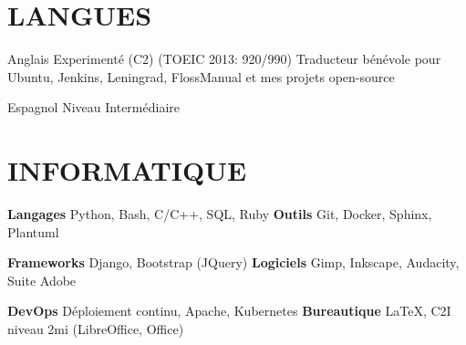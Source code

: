 \documentclass[11pt,a4paper]{moderncv}
\begin{document}


  \section{LANGUES}

  \cvlanguage
    {Anglais}
    {Experimenté (C2) (TOEIC 2013: 920/990)}
    {Traducteur bénévole pour Ubuntu, Jenkins, Leningrad, FlossManual et mes projets open-source}

  \cvlanguage
    {Espagnol}
    {Niveau Intermédiaire}
    {}{}{}{}

  \section{INFORMATIQUE}

  \cvcomputer
    {\textbf{Langages}}
    {Python, Bash, C/C++, SQL, Ruby}
    {\textbf{Outils}}
    {Git, Docker, Sphinx, Plantuml}

  \cvcomputer
    {\textbf{Frameworks}}
    {Django, Bootstrap (JQuery)}
    {\textbf{Logiciels}}
    {Gimp, Inkscape, Audacity, Suite Adobe}

  \cvcomputer
    {\textbf{DevOps}}
    {Déploiement continu, Apache, Kubernetes}
    {\textbf{Bureautique}}
    {\LaTeX{}, C2I niveau 2mi (LibreOffice, Office)}
\end{document}
